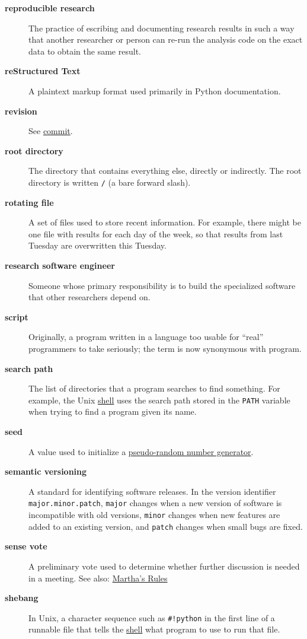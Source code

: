 \documentclass[
]{krantz}
\begin{document}
\begin{description}
\item[\textbf{reproducible research}]
The practice of escribing and documenting research results in such a way that another researcher or person can re-run the analysis code on the exact data to obtain the same result.
\item[\textbf{reStructured Text}]
A plaintext markup format used primarily in Python documentation.
\item[\textbf{revision}]
See \protect\hyperlink{commit}{commit}.
\item[\textbf{root directory}]
The directory that contains everything else, directly or indirectly. The root directory is written \texttt{/} (a bare forward slash).
\item[\textbf{rotating file}]
A set of files used to store recent information. For example, there might be one file with results for each day of the week, so that results from last Tuesday are overwritten this Tuesday.
\item[\textbf{research software engineer}]
Someone whose primary responsibility is to build the specialized software that other researchers depend on.
\item[\textbf{script}]
Originally, a program written in a language too usable for ``real'' programmers to take seriously; the term is now synonymous with program.
\item[\textbf{search path}]
The list of directories that a program searches to find something. For example, the Unix \protect\hyperlink{shell}{shell} uses the search path stored in the \texttt{PATH} variable when trying to find a program given its name.
\item[\textbf{seed}]
A value used to initialize a \protect\hyperlink{prng}{pseudo-random number generator}.
\item[\textbf{semantic versioning}]
A standard for identifying software releases. In the version identifier \texttt{major.minor.patch}, \texttt{major} changes when a new version of software is incompatible with old versions, \texttt{minor} changes when new features are added to an existing version, and \texttt{patch} changes when small bugs are fixed.
\item[\textbf{sense vote}]
A preliminary vote used to determine whether further discussion is needed in a meeting. See also: \protect\hyperlink{marthas_rules}{Martha's Rules}
\item[\textbf{shebang}]
In Unix, a character sequence such as \texttt{\#!python} in the first line of a runnable file that tells the \protect\hyperlink{shell}{shell} what program to use to run that file.

\end{description}
\end{document}
